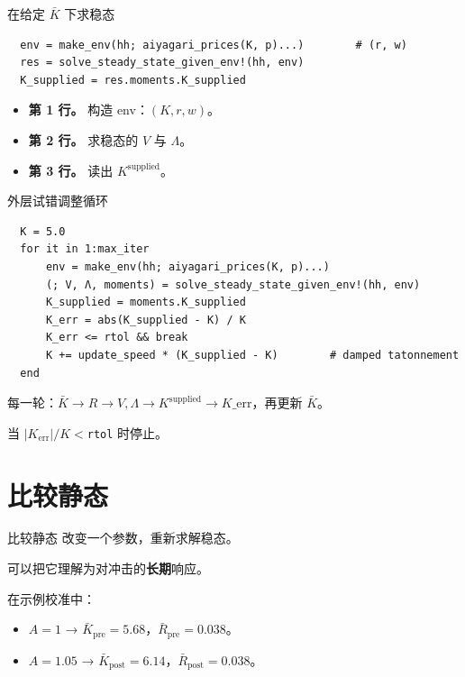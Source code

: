 \documentclass[10pt,aspectratio=169]{beamer}
\begin{document}
\begin{frame}[fragile]{在给定 $\bar K$ 下求稳态}
  \begin{lstlisting}
  env = make_env(hh; aiyagari_prices(K, p)...)        # (r, w)
  res = solve_steady_state_given_env!(hh, env)
  K_supplied = res.moments.K_supplied
  \end{lstlisting}
  \begin{itemize}
    \item \textbf{第 1 行。} 构造 env：$(K, r, w)$。
    \item \textbf{第 2 行。} 求稳态的 $V$ 与 $\Lambda$。
    \item \textbf{第 3 行。} 读出 $K^{\mathrm{supplied}}$。
  \end{itemize}
\end{frame}

\begin{frame}[fragile]{外层试错调整循环}
  \begin{lstlisting}
  K = 5.0
  for it in 1:max_iter
      env = make_env(hh; aiyagari_prices(K, p)...)
      (; V, Λ, moments) = solve_steady_state_given_env!(hh, env)
      K_supplied = moments.K_supplied
      K_err = abs(K_supplied - K) / K
      K_err <= rtol && break
      K += update_speed * (K_supplied - K)        # damped tatonnement
  end
  \end{lstlisting}
  每一轮：$\bar{K} \to R \to V,\Lambda \to K^{\mathrm{supplied}} \to K\_\text{err}$，再更新 $\bar K$。

  当 $|K_\mathrm{err}| / K < $\texttt{rtol} 时停止。
\end{frame}

\section[比较静态]{比较静态}

\begin{frame}{比较静态}
  改变一个参数，重新求解稳态。

  可以把它理解为对冲击的\textbf{长期}响应。

  在示例校准中：
  \begin{itemize}
    \item $A = 1$ → $\bar K_{\mathrm{pre}} = 5.68$，$\bar R_{\mathrm{pre}} = 0.038$。
    \item $A = 1.05$ → $\bar K_{\mathrm{post}} = 6.14$，$\bar R_{\mathrm{post}} = 0.038$。
  \end{itemize}
\end{frame}
\end{document}
